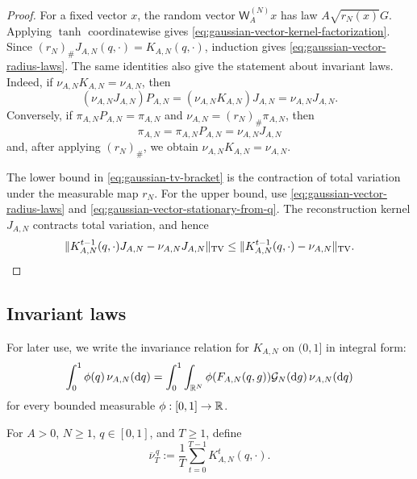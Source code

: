 \documentclass[11pt,reqno,a4paper]{article}
\newcommand{\TV}{\mathrm{TV}}
\begin{document}
\begin{proof}
  For a fixed vector $x$, the random vector $\mathsf W_A^{(N)}x$ has law
  $A\sqrt{r_N(x)}G$. Applying $\tanh$ coordinatewise gives
  \cref{eq:gaussian-vector-kernel-factorization}. Since
  $(r_N)_\#J_{A,N}(q,\cdot)=K_{A,N}(q,\cdot)$, induction gives
  \cref{eq:gaussian-vector-radius-laws}. The same identities also give the
  statement about invariant laws. Indeed, if $\nu_{A,N}K_{A,N}=\nu_{A,N}$,
  then
  \begin{equation*}
    \left(\nu_{A,N}J_{A,N}\right)P_{A,N}
    =
    \left(\nu_{A,N}K_{A,N}\right)J_{A,N}
    =
    \nu_{A,N}J_{A,N}.
  \end{equation*}
  Conversely, if $\pi_{A,N}P_{A,N}=\pi_{A,N}$ and
  $\nu_{A,N}=(r_N)_\#\pi_{A,N}$, then
  \begin{equation*}
    \pi_{A,N}
    =
    \pi_{A,N}P_{A,N}
    =
    \nu_{A,N}J_{A,N}
  \end{equation*}
  and, after applying $(r_N)_\#$, we obtain
  $\nu_{A,N}K_{A,N}=\nu_{A,N}$.

  The lower bound in \cref{eq:gaussian-tv-bracket} is the contraction of total
  variation under the measurable map $r_N$. For the upper bound, use
  \cref{eq:gaussian-vector-radius-laws} and
  \cref{eq:gaussian-vector-stationary-from-q}. The reconstruction kernel
  $J_{A,N}$ contracts total variation, and hence
  \begin{equation*}
    \norm{
      K_{A,N}^{t-1}(q,\cdot)J_{A,N}
      -
      \nu_{A,N}J_{A,N}
    }_{\TV}
    \leq
    \norm{K_{A,N}^{t-1}(q,\cdot)-\nu_{A,N}}_{\TV}.
  \end{equation*}
\end{proof}

\subsection{Invariant laws}
\label{subsec:invariant-laws}

For later use, we write the invariance relation for $K_{A,N}$ on $(0,1]$ in
integral form:
\begin{equation}\label{eq:gaussian-q-stationary-equation}
  \int_0^1\phi(q)\,\nu_{A,N}(\mathrm{d}q)
  =
  \int_0^1
  \int_{\R^N}
  \phi\left(F_{A,N}(q,g)\right)
  \mathcal G_N(\mathrm{d}g)\,
  \nu_{A,N}(\mathrm{d}q)
\end{equation}
for every bounded measurable $\phi:[0,1]\to\mathbb{R}$.

For $A>0$, $N\geq1$, $q\in[0,1]$, and $T\geq1$, define
\begin{equation}\label{eq:gaussian-cesaro-selection}
  \overline\nu_{T}^{\,q}
  :=
  \frac1T\sum_{t=0}^{T-1}K_{A,N}^t(q,\cdot).
\end{equation}
\end{document}
